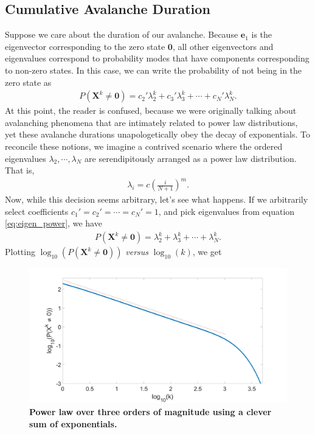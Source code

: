 \documentclass[superscriptaddress]{revtex4-1}
\begin{document}
\subsection{Cumulative Avalanche Duration}
Suppose we care about the duration of our avalanche. Because $\bm{e}_1$ is the eigenvector corresponding to the zero state $\bm{0}$, all other eigenvectors and eigenvalues correspond to probability modes that have components corresponding to non-zero states. In this case, we can write the probability of not being in the zero state as
\begin{align*}
P(\bm{X}^k \neq \bm{0}) = c_2'\lambda_2^k + c_3'\lambda_3^k + \dotsm + c_N'\lambda_N^k.
\end{align*}
At this point, the reader is confused, because we were originally talking about avalanching phenomena that are intimately related to power law distributions, yet these avalanche durations unapologetically obey the decay of exponentials. To reconcile these notions, we imagine a contrived scenario where the ordered eigenvalues $\lambda_2, \dotsm, \lambda_N$ are serendipitously arranged as a power law distribution. That is,
\begin{align}
\label{eq:eigen_power}
\lambda_i = c \left(\frac{i}{N+1}\right)^m.
\end{align}
Now, while this decision seems arbitrary, let's see what happens. If we arbitrarily select coefficients $c_1' = c_2' = \dotsm = c_N' = 1$, and pick eigenvalues from equation \ref{eq:eigen_power}, we have
\begin{align*}
P(\bm{X}^k \neq \bm{0}) = \lambda_2^k + \lambda_3^k + \dotsm + \lambda_N^k.
\end{align*}
Plotting $\log_{10}(P(\bm{X}^k \neq \bm{0}))$ \emph{versus} $\log_{10}(k)$, we get
\begin{figure}[h!]
	\centering
	\includegraphics[width=0.5\columnwidth]{power_exp_1.jpg}
	\caption{\textbf{Power law over three orders of magnitude using a clever sum of exponentials.}}
\end{figure}
\end{document}
